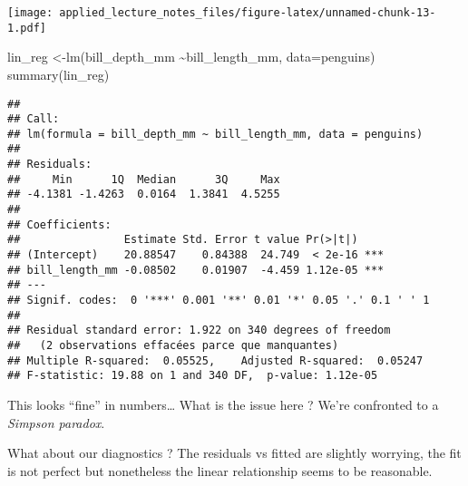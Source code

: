 \documentclass[
]{article}
\newenvironment{Shaded}{\begin{snugshade}}{\end{snugshade}}
\newcommand{\AttributeTok}[1]{\textcolor[rgb]{0.77,0.63,0.00}{#1}}
\newcommand{\DecValTok}[1]{\textcolor[rgb]{0.00,0.00,0.81}{#1}}
\newcommand{\FunctionTok}[1]{\textcolor[rgb]{0.00,0.00,0.00}{#1}}
\newcommand{\NormalTok}[1]{#1}
\newcommand{\OtherTok}[1]{\textcolor[rgb]{0.56,0.35,0.01}{#1}}
\newcommand{\SpecialCharTok}[1]{\textcolor[rgb]{0.00,0.00,0.00}{#1}}
\newcommand{\StringTok}[1]{\textcolor[rgb]{0.31,0.60,0.02}{#1}}
\begin{document}
\begin{Shaded}
\end{Shaded}

\texttt{[image: applied\_lecture\_notes\_files/figure-latex/unnamed-chunk-13-1.pdf]}

\begin{Shaded}
\begin{Highlighting}[]
\NormalTok{lin\_reg }\OtherTok{\textless{}{-}}\FunctionTok{lm}\NormalTok{(bill\_depth\_mm }\SpecialCharTok{\textasciitilde{}}\NormalTok{bill\_length\_mm, }\AttributeTok{data=}\NormalTok{penguins)}
\FunctionTok{summary}\NormalTok{(lin\_reg)}
\end{Highlighting}
\end{Shaded}

\begin{verbatim}
## 
## Call:
## lm(formula = bill_depth_mm ~ bill_length_mm, data = penguins)
## 
## Residuals:
##     Min      1Q  Median      3Q     Max 
## -4.1381 -1.4263  0.0164  1.3841  4.5255 
## 
## Coefficients:
##                Estimate Std. Error t value Pr(>|t|)    
## (Intercept)    20.88547    0.84388  24.749  < 2e-16 ***
## bill_length_mm -0.08502    0.01907  -4.459 1.12e-05 ***
## ---
## Signif. codes:  0 '***' 0.001 '**' 0.01 '*' 0.05 '.' 0.1 ' ' 1
## 
## Residual standard error: 1.922 on 340 degrees of freedom
##   (2 observations effacées parce que manquantes)
## Multiple R-squared:  0.05525,    Adjusted R-squared:  0.05247 
## F-statistic: 19.88 on 1 and 340 DF,  p-value: 1.12e-05
\end{verbatim}

This looks ``fine'' in numbers\ldots{} What is the issue here ? We're
confronted to a \emph{Simpson paradox}.

What about our diagnostics ? The residuals vs fitted are slightly
worrying, the fit is not perfect but nonetheless the linear relationship
seems to be reasonable.

\begin{Shaded}
\end{Shaded}
\end{document}
